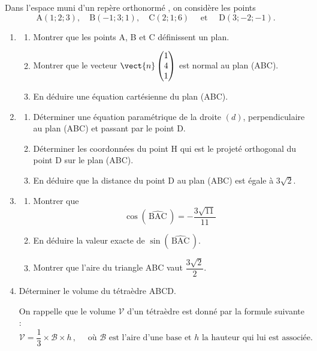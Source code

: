 Dans l'espace muni d'un repère orthonormé \Oijk, on considère les points
\[\mathrm{A}(1 ; 2 ; 3),\quad \mathrm{B}(-1 ; 3 ; 1),\quad \mathrm{C}(2 ; 1 ; 6) \quad \text { et } \quad \mathrm{D}(3 ;-2 ;-1).\]

	\begin{enumerate}
		\item \begin{enumerate}
			\item Montrer que les points A, B et C définissent un plan.

			\item Montrer que le vecteur $\vect{n}\begin{pmatrix} 1 \\ 4 \\ 1 \end{pmatrix}$ est normal au plan (ABC).

			\item  En déduire une équation cartésienne du plan (ABC).
		\end{enumerate}

		\item \begin{enumerate}
			\item Déterminer une équation paramétrique de la droite $(d)$, perpendiculaire au plan (ABC) et passant par le point D.

			\item Déterminer les coordonnées du point H qui est le projeté orthogonal du point D sur le plan (ABC).

			\item En déduire que la distance du point D au plan (ABC) est égale à $3\sqrt{2}$.
		\end{enumerate}

		\item \begin{enumerate}
			\item Montrer que
			\[\cos\left(\,\widehat{\mathrm{BAC}}\,\right)=-\dfrac{3\sqrt{11}}{11}\]

			\item En déduire la valeur exacte de $\sin\left(\,\widehat{\mathrm{BAC}}\,\right)$.

			\item Montrer que l'aire du triangle ABC vaut $\dfrac{3\sqrt{2}}{2}$.
		\end{enumerate}

		\item Déterminer le volume du tétraèdre ABCD.

		On rappelle que le volume $\mathcal{V}$ d'un tétraèdre est donné par la formule suivante :
		\[\mathcal{V}=\dfrac{1}{3}\times\mathcal{B}\times h\, ,\quad \text{ où } \mathcal{B}\text{ est l'aire d'une base et } h\text{ la hauteur qui lui est associée.}\]
	\end{enumerate}
